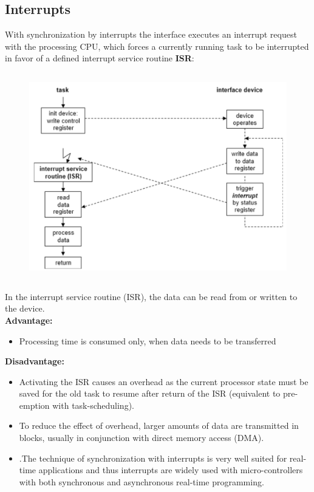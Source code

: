 \subsection{Interrupts}

With synchronization by interrupts the interface executes an interrupt request with the processing CPU, which forces a currently running task to be interrupted in favor of a defined interrupt service routine \textbf{ISR}:

 	\begin{figure}[h]
    \centering
    \includegraphics[width=14cm, height=9cm]{Images/image126.png}
    \label{fig:Fig 75}
    \end{figure}

In the interrupt service routine (ISR), the data can be read from or written to the device.\\

\textbf{Advantage: }

\begin{itemize}
\item Processing time is consumed only, when data needs to be transferred
\end{itemize}

\textbf{Disadvantage: }
\begin{itemize}
\item Activating the ISR causes an overhead as the current processor state must be    saved for the old task to resume after return of the ISR    (equivalent to pre-emption with task-scheduling).
\item To reduce the effect of overhead, larger amounts of data are transmitted in blocks, usually in conjunction with direct memory access (DMA).
\item .The technique of synchronization with interrupts is very well suited for real-time applications and thus interrupts are widely used with micro-controllers with both synchronous and asynchronous real-time programming.
\end{itemize}

